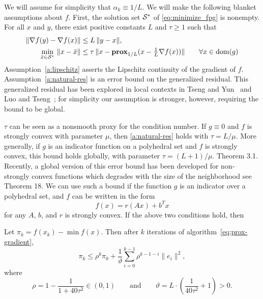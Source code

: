 
We will assume for simplicity that
$\alpha_{k}\equiv 1/L$. We will make the following blanket
assumptions about $f$. First, the solution set $\mathcal{S^*}$ of \eqref{eq:minimize_fpg}
is nonempty. For all $x$ and $y$, there exist  positive constants $L$
and $\tau\geq 1$ such that
\begin{subequations}
\begin{align}
  \|{\nabla f(y)-\nabla f(x) \|} 
  &\le L\,\|{y-x}\|, 
  \label{a:lipschitz}
  \\ \min_{\bar{x}\in\mathcal{S^*}}\,\|x-\bar{x}\|
  &\leq\tau\,\|{x-\mathbf{prox}_{1/L}(x-\tfrac1L\nabla f(x)})\|\qquad 
  \forall x \in \mbox{dom}(g)
   \label{a:natural-res}
\end{align}
\end{subequations}
Assumption~\eqref{a:lipschitz} asserts the Lipschitz continuity of the
gradient of $f$. Assumption~\eqref{a:natural-res} is an error bound on
the generalized residual. This generalized residual has been explored
in local contexts in Tseng and Yun~\cite{Tsy09a} and Luo and
Tseng~\cite{LuT94}; for simplicity our assumption is stronger,
however, requiring the bound to be global.

$\tau$ can be seen as a nonsmooth proxy for the condition number. If
$g\equiv0$ and $f$ is strongly convex with parameter $\mu$, then
\eqref{a:natural-res} holds with $\tau = L/\mu$. More generally, if
$g$ is an indicator function on a polyhedral set and $f$ is strongly
convex, this bound holds globally, with parameter $\tau = (L +
1)/\mu$. \cite{Pan87} Theorem 3.1. Recently, a global version of this
error bound has been developed for non- strongly convex functions
which degrades with the size of the neighborhood see
\cite{wang2014iteration} Theorem 18. We can use such a bound if the
function $g$ is an indicator over a polyhedral set, and $f$ can be
written in the form \[ f(x) = r(Ax) + b^{T}x \] for any $A$, $b$,
and $r$ is strongly convex. If the above two conditions hold, then


\begin{lem}
  \label{lem:obj-val-bnd}
  Let $\pi_k = f(x_k) - \min f(x)$. Then after $k$ iterations of algorithm~\eqref{eq:prox-gradient},
  \begin{equation*}
    \pi_k  \le \rho^k \pi_0 
    + \frac{1}{\vartheta}
    \sum_{i=0}^{k-1}\rho^{k-1-i}\|e_i\|^2,
  \end{equation*}
  where
  $$\rho = 1- \frac{1}{1+40\tau^{2}}\in(0,1) \qquad \text{and} 
  \qquad \vartheta = L\cdot\left(\frac{1}{40\tau^{2}}+1\right)>0.$$
\end{lem}

